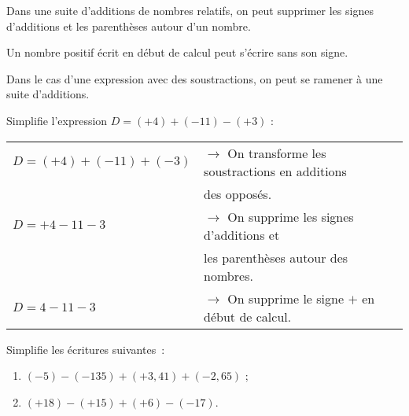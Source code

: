 
\begin{methode*1}

\begin{aconnaitre}
Dans une suite d'additions de nombres relatifs, on peut supprimer les signes d'additions et les parenthèses autour d'un nombre.

Un nombre positif écrit en début de calcul peut s'écrire sans son signe.
\end{aconnaitre}

\begin{remarque}
Dans le cas d'une expression avec des soustractions, on peut se ramener à une suite d'additions.
 \end{remarque}

 \begin{exemple*1}
Simplifie l'expression $D = (+ 4) + (- 11) - (+ 3)$ :
\begin{tabular}{ll} 
$D = (+ 4) + (- 11) + (- 3)$ & $\rightarrow$ On transforme les soustractions en additions \\
 & \phantom{$\rightarrow$} des opposés. \\
$D = + 4 - 11 - 3$ & $\rightarrow$ On supprime les signes d'additions et \\
 & \phantom{$\rightarrow$} les parenthèses autour des nombres. \\
$D = 4 - 11 - 3$ & $\rightarrow$ On supprime le signe $+$ en début de calcul. \\
\end{tabular}
 \end{exemple*1}

\exercice
Simplifie les écritures suivantes :
\begin{enumerate}
 \item $(- 5) - (- 135) + (+ 3,41) + (- 2,65)$ ;
 \item $(+ 18) - (+ 15) + (+ 6) - (- 17)$.
 \end{enumerate}

\end{methode*1}
